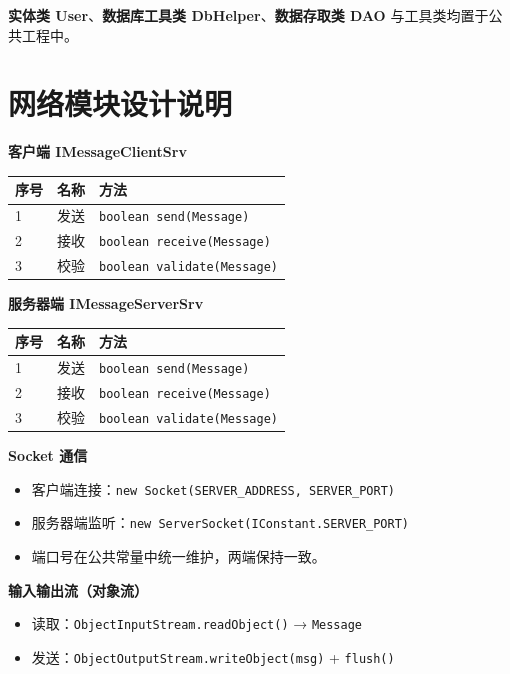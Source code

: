 \documentclass[12pt,a4paper]{ctexart}
\begin{document}
\textbf{实体类 User}、\textbf{数据库工具类 DbHelper}、\textbf{数据存取类 DAO} 与工具类均置于公共工程中。

\section{网络模块设计说明}

\textbf{客户端 IMessageClientSrv}
\begin{center}
\begin{tabular}{l l l}
\toprule
序号 & 名称 & 方法 \\
\midrule
1 & 发送 & \texttt{boolean send(Message)} \\
2 & 接收 & \texttt{boolean receive(Message)} \\
3 & 校验 & \texttt{boolean validate(Message)} \\
\bottomrule
\end{tabular}
\end{center}

\textbf{服务器端 IMessageServerSrv}
\begin{center}
\begin{tabular}{l l l}
\toprule
序号 & 名称 & 方法 \\
\midrule
1 & 发送 & \texttt{boolean send(Message)} \\
2 & 接收 & \texttt{boolean receive(Message)} \\
3 & 校验 & \texttt{boolean validate(Message)} \\
\bottomrule
\end{tabular}
\end{center}

\textbf{Socket 通信}
\begin{itemize}
  \item 客户端连接：\texttt{new Socket(SERVER\_ADDRESS, SERVER\_PORT)}
  \item 服务器端监听：\texttt{new ServerSocket(IConstant.SERVER\_PORT)}
  \item 端口号在公共常量中统一维护，两端保持一致。
\end{itemize}

\textbf{输入输出流（对象流）}
\begin{itemize}
  \item 读取：\texttt{ObjectInputStream.readObject()} → \texttt{Message}
  \item 发送：\texttt{ObjectOutputStream.writeObject(msg)} + \texttt{flush()}
\end{itemize}
\end{document}
